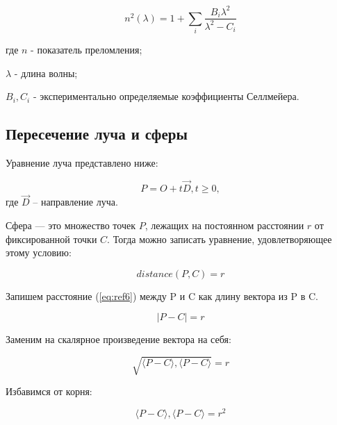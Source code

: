             \begin{equation}
                n^2(\lambda) = 1 + \sum_{i}^{} \frac{B_i \lambda^2}{\lambda^2 - C_i}  \label{eq:zel}
            \end{equation}
            
            где \( n \) - показатель преломления;
            
            \( \lambda \) - длина волны;
            
            \( B_i, C_i \) - экспериментально определяемые коэффициенты Селлмейера.
    
        \subsection{Пересечение луча и сферы}
        
            Уравнение луча представлено ниже:

            \begin{equation}
            	P = O + t\overrightarrow{D}, t \geq 0,
            	\label{eq:ref5}
            \end{equation}
            где $\overrightarrow{D}$ -- направление луча.
            
            Сфера — это множество точек $P$, лежащих на постоянном расстоянии $r$ от фиксированной точки $C$. Тогда можно записать уравнение, удовлетворяющее этому условию:
            
            \begin{equation}
            	distance(P,C) = r
            	\label{eq:ref6}
            \end{equation}
            
            Запишем расстояние (\ref{eq:ref6}) между P и C как длину вектора из P в C.
            
            \begin{equation}
            	|P-C|=r
            \end{equation}
            
            Заменим на скалярное произведение вектора на себя:
            
            \begin{equation}
            	\sqrt{\langle P - C\rangle, \langle P - C\rangle} = r
            \end{equation}
            
            Избавимся от корня:
            
            \begin{equation}
            	\langle P - C\rangle, \langle P - C\rangle = r^2
            	\label{eq:ref7}
            \end{equation}
            
